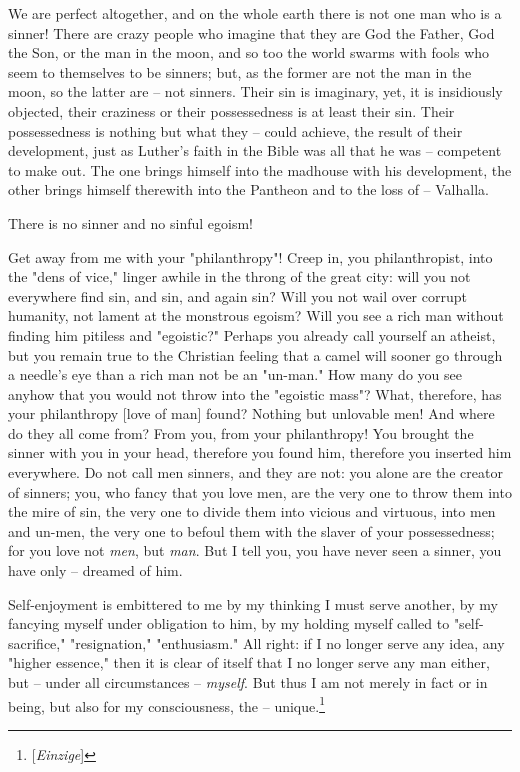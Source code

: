 We are perfect altogether, and on the whole earth there is not one man who is 
a sinner! There are crazy people who imagine that they are God the Father, God 
the Son, or the man in the moon, and so too the world swarms with fools who 
seem to themselves to be sinners; but, as the former are not the man in the 
moon, so the latter are -- not sinners. Their sin is imaginary, yet, it is 
insidiously objected, their craziness or their possessedness is at least their 
sin. Their possessedness is nothing but what they -- could achieve, the result 
of their development, just as Luther's faith in the Bible was all that he was 
-- competent to make out. The one brings himself into the madhouse with his 
development, the other brings himself therewith into the Pantheon and to the 
loss of -- Valhalla.

There is no sinner and no sinful egoism!

Get away from me with your "{}philanthropy"{}! Creep in, you philanthropist, 
into the "{}dens of vice,"{} linger awhile in the throng of the great city: 
will you not everywhere find sin, and sin, and again sin? Will you not wail 
over corrupt humanity, not lament at the monstrous egoism? Will you see a rich 
man without finding him pitiless and "{}egoistic?"{} Perhaps you already call 
yourself an atheist, but you remain true to the Christian feeling that a camel 
will sooner go through a needle's eye than a rich man not be an "{}un-man."{} 
How many do you see anyhow that you would not throw into the "{}egoistic 
mass"{}? What, therefore, has your philanthropy [love of man] found? Nothing 
but unlovable men! And where do they all come from? From you, from your 
philanthropy! You brought the sinner with you in your head, therefore you 
found him, therefore you inserted him everywhere. Do not call men sinners, and 
they are not: you alone are the creator of sinners; you, who fancy that you 
love men, are the very one to throw them into the mire of sin, the very one to 
divide them into vicious and virtuous, into men and un-men, the very one to 
befoul them with the slaver of your possessedness; for you love not 
\textit{men}, but \textit{man}. But I tell you, you have never seen a sinner, 
you have only -- dreamed of him.

Self-enjoyment is embittered to me by my thinking I must serve another, by my 
fancying myself under obligation to him, by my holding myself called to 
"{}self-sacrifice,"{} "{}resignation,"{} "{}enthusiasm."{} All right: if I no 
longer serve any idea, any "{}higher essence,"{} then it is clear of itself 
that I no longer serve any man either, but -- under all circumstances -- 
\textit{myself}. But thus I am not merely in fact or in being, but also for my 
consciousness, the -- unique.\footnote{[\textit{Einzige}]}

